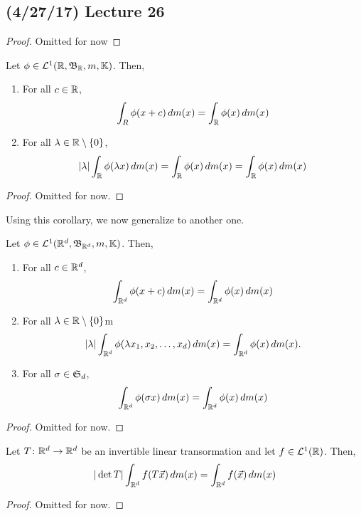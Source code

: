 \documentclass[11pt,leqno,oneside]{amsbook}
\numberwithin{thm}{section}
\newcommand{\cL}{\mathcal{L}}
\newcommand{\K}{\mathbb{K}} %
\begin{document}
\subsection*{(4/27/17) Lecture 26}
\begin{proof}
  Omitted for now
\end{proof}
\begin{cor}
  Let \(\phi \in \cL^1(\R,\B_\R,m,\K)\). Then,
  \begin{enumerate}
  \item For all \(c \in {\mathbb R}\), \[
      \int_R \phi(x+c) \, d m(x) = \int_{\mathbb R} \phi(x) \, d m(x)
    \]
  \item For all \(\lambda \in {\mathbb R}\setminus\{0\}\), \[
      |\lambda| \int_{\mathbb R} \phi(\lambda x)\, d m(x) = \int_{\mathbb R} \phi(x) \, d
      m(x) = \int_{\mathbb R} \phi(x) \, d m(x)
    \]
  \end{enumerate}
\end{cor}
\begin{proof}
  Omitted for now.
\end{proof}
Using this corollary, we now generalize to another one.
\begin{cor}
  Let \(\phi \in \cL^1(\R^d,\B_{\R^d},m,\K)\). Then,
  \begin{enumerate}
  \item For all \(c \in {\mathbb R}^d\), \[
      \int_{{\mathbb R}^d} \phi(x+c) \, d m(x) = \int_{{\mathbb R}^d} \phi(x) \, d m(x)
    \]
  \item For all \(\lambda \in {\mathbb R} \setminus \{0\}\)m \[
      |\lambda| \int_{{\mathbb R}^d} \phi(\lambda x_1, x_2, \ldots, x_d) \, d
      m(x) = \int_{{\mathbb R}^d} \phi(x) \, d m(x).
    \]
  \item For all \(\sigma \in \mathfrak{S}_d\), \[
      \int_{{\mathbb R}^d} \phi(\sigma x) \, d m(x) = \int_{{\mathbb R}^d} \phi(x) \, d m(x)
    \]
  \end{enumerate}
\end{cor}
\begin{proof}
  Omitted for now.
\end{proof}
\begin{cor}
  Let \(T \colon {\mathbb R}^d \to {\mathbb R}^d\) be an invertible linear transormation
  and let \(f \in \cL^1(\R)\). Then, \[
    |\det T| \int_{{\mathbb R}^d} f(T \vec{x}) \, d m(x) = \int_{{\mathbb R}^d} f(\vec{x})
    \, d m(x)
  \]
\end{cor}
\begin{proof}
  Omitted for now.
\end{proof}
\end{document}
